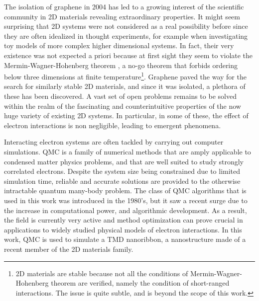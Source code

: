 
\label{cap:int}

\slshape

The isolation of graphene in 2004 has led to a growing interest of the scientific community in \ac{2D} materials revealing extraordinary properties.
It might seem surprising that \ac{2D} systems were not considered as a real possibility before since they are often idealized in thought experiments, for example when investigating toy models of more complex higher dimensional systems.
In fact, their very existence was not expected a priori because at first sight they seem to violate the Mermin-Wagner-Hohenberg theorem \cite{mermin_absence_1966, coleman_there_1973, hohenberg_existence_1967}, a no-go theorem that forbids ordering below three dimensions at finite temperature\footnote{\ac{2D} materials are stable because not all the conditions of Mermin-Wagner-Hohenberg theorem are verified, namely the condition of short-ranged interactions. The issue is quite subtle, and is beyond the scope of this work.}.
Graphene paved the way for the search for similarly stable \ac{2D} materials, and since it was isolated, a plethora of these has been discovered.
A vast set of open problems remains to be solved within the realm of the fascinating and counterintuitive properties of the now huge variety of existing \ac{2D} systems.
In particular, in some of these, the effect of electron interactions is non negligible, leading to emergent phenomena.

Interacting electron systems are often tackled by carrying out computer simulations.
\ac{QMC} is a family of numerical methods that are  amply applicable to condensed matter physics problems, and that are well suited to study strongly correlated electrons.
Despite the system size being constrained due to limited simulation time, reliable and accurate solutions are provided to the otherwise intractable quantum many-body problem.
The class of \acs{QMC} algorithms that is used in this work was introduced in the 1980's, but it saw a recent surge due to the increase in computational power, and algorithmic development.
As a result, the field is currently very active and method optimization can prove crucial in applications to widely studied physical models of electron interactions.
In this work, \acs{QMC} is used to simulate a \ac{TMD} nanoribbon, a nanostructure made of a recent member of the \acs{2D} materials family.

\normalfont







\cleardoublepage